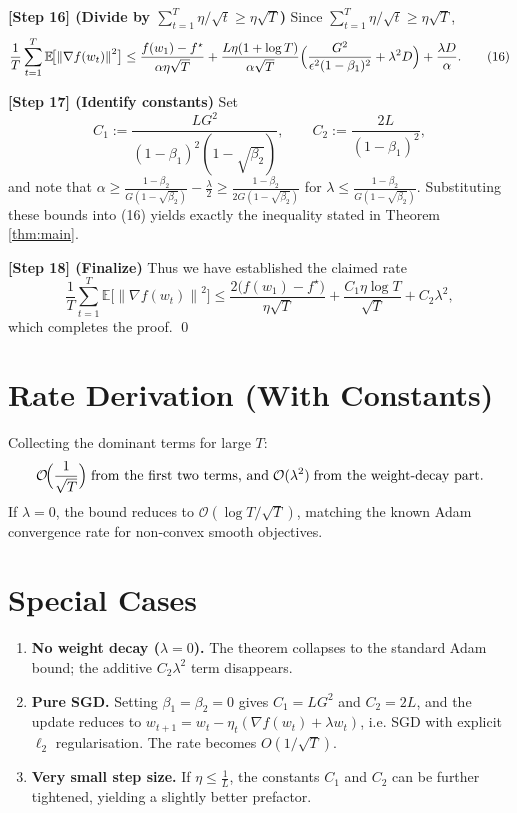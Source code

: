 \documentclass{article}
\newcommand{\EE}{\mathbb{E}}
\newcommand{\norm}[1]{\left\|#1\right\|}
\begin{document}
\noindent\textbf{[Step 16] (Divide by $\sum_{t=1}^{T}\eta/\sqrt{t}\ge \eta\sqrt{T}$)}  
Since $\sum_{t=1}^{T}\eta/\sqrt{t}\ge \eta\sqrt{T}$,
\[
\frac{1}{T}\sum_{t=1}^{T}\EE\!\bigl[\norm{\nabla f(w_t)}^{2}\bigr]
\le
\frac{f(w_1)-f^\star}{\alpha\eta\sqrt{T}}
+\frac{L\eta(1+\log T)}{\alpha\sqrt{T}}
\Bigl(\frac{G^{2}}{\epsilon^{2}(1-\beta_1)^{2}}+\lambda^{2}D\Bigr)
+\frac{\lambda D}{\alpha}.
\tag{16}
\]

\noindent\textbf{[Step 17] (Identify constants)}  
Set
\[
C_1:=\frac{L G^{2}}{(1-\beta_1)^{2}(1-\sqrt{\beta_2})},\qquad
C_2:=\frac{2L}{(1-\beta_1)^{2}},
\]
and note that $\alpha\ge\frac{1-\beta_2}{G(1-\sqrt{\beta_2})}-\frac{\lambda}{2}\ge\frac{1-\beta_2}{2G(1-\sqrt{\beta_2})}$ for $\lambda\le\frac{1-\beta_2}{G(1-\sqrt{\beta_2})}$. Substituting these bounds into (16) yields exactly the inequality stated in Theorem \ref{thm:main}.

\noindent\textbf{[Step 18] (Finalize)}  
Thus we have established the claimed rate
\[
\frac{1}{T}\sum_{t=1}^{T}\EE\!\bigl[\norm{\nabla f(w_t)}^{2}\bigr]
\le
\frac{2\bigl(f(w_1)-f^\star\bigr)}{\eta\sqrt{T}}
+\frac{C_1\eta\log T}{\sqrt{T}}+C_2\lambda^{2},
\]
which completes the proof. \qed

\section*{Rate Derivation (With Constants)}
Collecting the dominant terms for large $T$:
\[
\mathcal{O}\!\Bigl(\frac{1}{\sqrt{T}}\Bigr) 
\;\text{from the first two terms, and}\;
\mathcal{O}(\lambda^{2}) \;\text{from the weight‑decay part.}
\]
If $\lambda=0$, the bound reduces to $\mathcal{O}(\log T/\sqrt{T})$, matching the known Adam convergence rate for non‑convex smooth objectives.

\section*{Special Cases}
\begin{enumerate}[leftmargin=*]
\item \textbf{No weight decay ($\lambda=0$).} The theorem collapses to the standard Adam bound; the additive $C_2\lambda^{2}$ term disappears.
\item \textbf{Pure SGD.} Setting $\beta_1=\beta_2=0$ gives $C_1=L G^{2}$ and $C_2=2L$, and the update reduces to $w_{t+1}=w_t-\eta_t(\nabla f(w_t)+\lambda w_t)$, i.e. SGD with explicit $\ell_2$ regularisation. The rate becomes $O(1/\sqrt{T})$.
\item \textbf{Very small step size.} If $\eta\le\frac{1}{L}$, the constants $C_1$ and $C_2$ can be further tightened, yielding a slightly better prefactor.
\end{enumerate}
\end{document}
